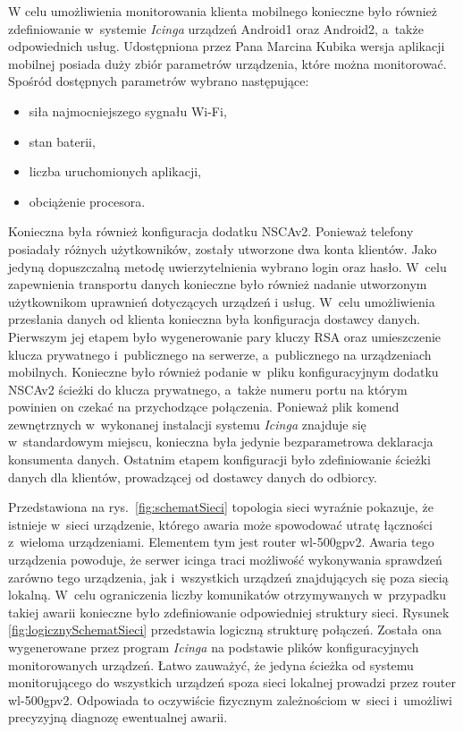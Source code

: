 W celu umożliwienia monitorowania klienta mobilnego konieczne było
również zdefiniowanie w~systemie {\em Icinga} urządzeń Android1 oraz
Android2, a~także odpowiednich usług. Udostępniona przez Pana Marcina
Kubika wersja aplikacji mobilnej posiada duży zbiór parametrów
urządzenia, które można monitorować. Spośród dostępnych parametrów
wybrano następujące:

\begin{itemize}
\item siła najmocniejszego sygnału Wi-Fi,
\item stan baterii,
\item liczba uruchomionych aplikacji,
\item obciążenie procesora.
\end{itemize}

Konieczna była również konfiguracja dodatku NSCAv2. Ponieważ telefony
posiadały różnych użytkowników, zostały utworzone dwa konta
klientów. Jako jedyną dopuszczalną metodę uwierzytelnienia wybrano
login oraz hasło. W~celu zapewnienia transportu danych konieczne było
również nadanie utworzonym użytkownikom uprawnień dotyczących urządzeń
i usług. W~celu umożliwienia przesłania danych od klienta konieczna
była konfiguracja dostawcy danych. Pierwszym jej etapem było
wygenerowanie pary kluczy RSA oraz umieszczenie klucza prywatnego
i~publicznego na serwerze, a~publicznego na urządzeniach
mobilnych. Konieczne było również podanie w~pliku konfiguracyjnym
dodatku NSCAv2 ścieżki do klucza prywatnego, a~także numeru portu na
którym powinien on czekać na przychodzące połączenia. Ponieważ plik
komend zewnętrznych w~wykonanej instalacji systemu {\em Icinga} znajduje się
w~standardowym miejscu, konieczna była jedynie bezparametrowa
deklaracja konsumenta danych. Ostatnim etapem konfiguracji było
zdefiniowanie ścieżki danych dla klientów, prowadzącej od dostawcy
danych do odbiorcy.

Przedstawiona na rys.~\ref{fig:schematSieci} topologia sieci wyraźnie
pokazuje, że istnieje w~sieci urządzenie, którego awaria może
spowodować utratę łączności z~wieloma urządzeniami. Elementem tym jest
router wl-500gpv2. Awaria tego urządzenia powoduje, że serwer icinga
traci możliwość wykonywania sprawdzeń zarówno tego urządzenia, jak
i~wszystkich urządzeń znajdujących się poza siecią lokalną. W~celu
ograniczenia liczby komunikatów otrzymywanych w~przypadku takiej
awarii konieczne było zdefiniowanie odpowiedniej struktury
sieci. Rysunek \ref{fig:logicznySchematSieci} przedstawia logiczną
strukturę połączeń. Została ona wygenerowane przez program {\em Icinga} na
podstawie plików konfiguracyjnych monitorowanych urządzeń. Łatwo
zauważyć, że jedyna ścieżka od systemu monitorującego do wszystkich
urządzeń spoza sieci lokalnej prowadzi przez router
wl-500gpv2. Odpowiada to oczywiście fizycznym zależnościom w~sieci
i~umożliwi precyzyjną diagnozę ewentualnej awarii.


